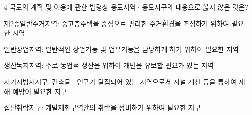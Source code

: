 \begin{question}{4}
국토의 계획 및 이용에 관한 법령상 용도지역ㆍ용도지구의 내용으로 옳지 않은 것은?
\begin{choices}
  \item 제2종일반주거지역: 중고층주택을 중심으로 편리한 주거환경을 조성하기 위하여 필요한 지역
  \item 일반상업지역: 일반적인 상업기능 및 업무기능을 담당하게 하기 위하여 필요한 지역
  \item 생산녹지지역: 주로 농업적 생산을 위하여 개발을 유보할 필요가 있는 지역
  \item 시가지방재지구: 건축물ㆍ인구가 밀집되어 있는 지역으로서 시설 개선 등을 통하여 재해 예방이 필요한 지구
  \item 집단취락지구: 개발제한구역안의 취락을 정비하기 위하여 필요한 지구
\end{choices}
\end{question}
